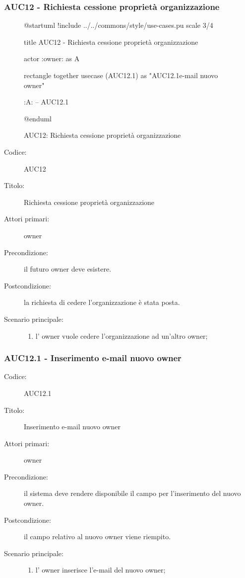 \documentclass[casi-duso]{subfiles}
\begin{document}
\subsubsection{AUC12 - Richiesta cessione proprietà organizzazione}%
\label{subsub:AUC12}

\begin{figure}[h!] 
  \centering 
  \begin{plantuml}
  @startuml 
  !include ../../commons/style/use-cases.pu
  scale 3/4

  title AUC12 - Richiesta cessione proprietà organizzazione

  actor :owner: as A

  rectangle {
    together {
      usecase (AUC12.1) as "AUC12.1\nInserimento e-mail nuovo owner"
    }
  }

  :A: -- AUC12.1

  @enduml
  \end{plantuml} 
  \caption{AUC12: Richiesta cessione proprietà organizzazione} 
  \label{fig:auc12} 
\end{figure}

\begin{description}
  \item[Codice:] AUC12
  \item[Titolo:] Richiesta cessione proprietà organizzazione
  \item[Attori primari:] owner
  \item[Precondizione:] il futuro owner deve esistere.
  \item[Postcondizione:] la richiesta di cedere l'organizzazione è stata posta.
  \item[Scenario principale:] 
  \begin{enumerate}
    \item l' owner vuole cedere l'organizzazione ad un'altro owner;
  \end{enumerate}
\end{description}

\subsubsection{AUC12.1 - Inserimento e-mail nuovo owner}%
\label{subsub:AUC12.1}
\begin{description}
  \item[Codice:] AUC12.1
  \item[Titolo:] Inserimento e-mail nuovo owner
  \item[Attori primari:] owner
  \item[Precondizione:] il sistema deve rendere disponibile il campo per l'inserimento del nuovo owner.
  \item[Postcondizione:] il campo relativo al nuovo owner viene riempito.
  \item[Scenario principale:] 
  \begin{enumerate}
    \item l' owner inserisce l'e-mail del nuovo owner;
  \end{enumerate}
\end{description}
\end{document}
